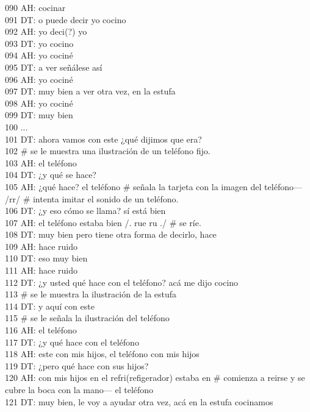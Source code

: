 090 AH: cocinar\\
091 DT: o puede decir yo cocino\\
092 AH: yo deci(?) yo\\
093 DT: yo cocino\\
094 AH: yo cociné\\
095 DT: a ver señálese así\\
096 AH: yo cociné\\
097 DT: muy bien a ver otra vez, en la estufa\\
098 AH: yo cociné \\
099 DT: muy bien\\
100 ...\\
101 DT: ahora vamos con este ¿qué dijimos que era?\\
102 \# se le muestra una ilustración de un teléfono fijo.\\
103 AH: el teléfono\\
104 DT: ¿y qué se hace?\\
105 AH: ¿qué hace? el teléfono \# señala la tarjeta con la imagen del teléfono--- /rr/ \# intenta imitar el sonido de un teléfono.\\
106 DT: ¿y eso cómo se llama? sí está bien\\
107 AH: el teléfono estaba bien /. rue ru ./ \# se ríe.\\
108 DT: muy bien pero tiene otra forma de decirlo, hace\\
109 AH: hace ruido\\
110 DT: eso muy bien\\
111 AH: hace ruido \\
112 DT: ¿y usted qué hace con el teléfono? acá me dijo cocino\\
113 \# se le muestra la ilustración de la estufa\\
114 DT: y aquí con este\\
115 \# se le señala la ilustración del teléfono\\
116 AH: el teléfono\\
117 DT: ¿y qué hace con el teléfono\\
118 AH: este con mis hijos, el teléfono con mis hijos\\
119 DT: ¿pero qué hace con sus hijos?\\
120 AH: con mis hijos en el refri(refigerador) estaba en \# comienza a reirse y se cubre la boca con la mano--- el teléfono\\
121 DT: muy bien, le voy a ayudar otra vez, acá en la estufa cocinamos\\
